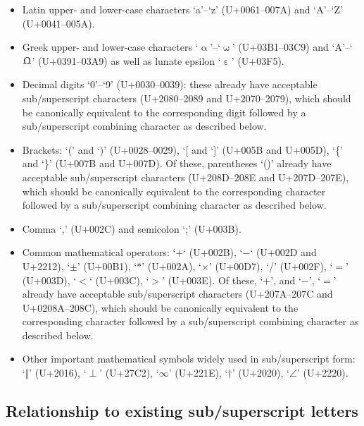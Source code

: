 \documentclass[10pt,english]{article}
\begin{document}
\begin{itemize}

\item Latin upper- and lower-case characters `a'--`z' (U+0061--007A) and `A'--`Z' (U+0041--005A).

\item Greek upper- and lower-case characters `$\upalpha$'--`$\upomega$' (U+03B1--03C9) and `A'--`$\Upomega$' (U+0391--03A9) as well as lunate epsilon `$\upepsilon$' (U+03F5).

\item Decimal digits `0'--`9'  (U+0030--0039): these already have acceptable sub/superscript characters (U+2080--2089 and U+2070--2079), which should be canonically equivalent to the corresponding digit followed by a sub/superscript combining character as described below.

\item Brackets: `(' and `)' (U+0028--0029),  `[ and `]' (U+005B and U+005D), `\{' and `\}' (U+007B and U+007D).   Of these, parentheses `()' already have acceptable sub/superscript characters (U+208D--208E and U+207D--207E), which should be canonically equivalent to the corresponding character followed by a sub/superscript combining character as described below.

\item Comma `,' (U+002C) and semicolon `;' (U+003B).

\item Common mathematical operators: `$+$` (U+002B), `$-$` (U+002D and U+2212), `$\pm$' (U+00B1), `$*$' (U+002A), `$\times$' (U+00D7), `/' (U+002F), `$=$' (U+003D), `$<$` (U+003C), `$>$' (U+003E).   Of these, `$+$', and `$-$', `$=$' already have acceptable sub/superscript characters (U+207A--207C and U+0208A--208C), which should be canonically equivalent to the corresponding character followed by a sub/superscript combining character as described below.

\item Other important mathematical symbols widely used in sub/superscript form: `$\Vert$'  (U+2016), `$\perp$' (U+27C2), `$\infty$' (U+221E), `$\dagger$' (U+2020), `$\angle$' (U+2220).

\end{itemize}

\subsection{Relationship to existing sub/superscript letters}
\end{document}
